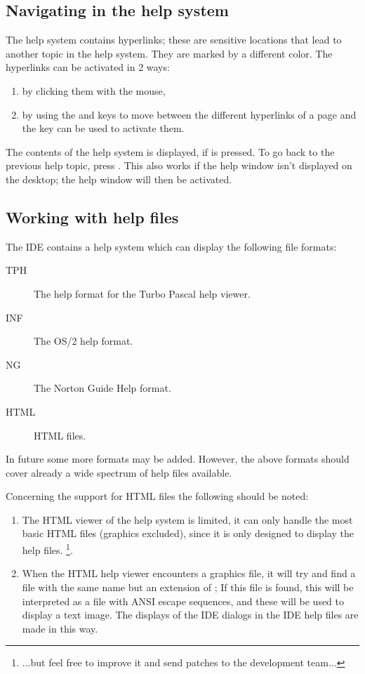 \subsection{Navigating in the help system}
The help system contains hyperlinks; these are sensitive locations that
lead to another topic in the help system. They are marked by a different
color. The hyperlinks can be activated in 2 ways:
\begin{enumerate}
\item by clicking them with the mouse,
\item by using the  and  keys to move between 
the different hyperlinks of a page and the  key can be used 
to activate them.
\end{enumerate}

The contents of the help system is displayed, if  is
pressed. To go back to the previous help topic, press . 
This also works if the help window isn't displayed on the desktop; the help
window will then be activated.

%
%
\subsection{Working with help files}
The IDE contains a help system which can display the following file formats:
\begin{description}
\item[TPH] The help format for the Turbo Pascal help viewer.
\item[INF] The OS/2 help format.
\item[NG] The Norton Guide Help format.
\item[HTML] HTML files. 
\end{description}
In future some more formats may be added. However, the above formats should 
cover already a wide spectrum of help files available.

\begin{remark}
Concerning the support for HTML files the following should be noted:
\begin{enumerate}
\item
The HTML viewer of the  help system is limited, it can only handle the 
most basic HTML files (graphics excluded), since it is only designed 
to display the \fpc help files. \footnote{...but feel free to improve it and send patches to the 
\fpc development team...}.
\item
When the HTML help viewer encounters a graphics file, it will try and find a
file with the same name but an extension of ; If this file is
found, this will be interpreted as a file with ANSI escape sequences, and 
these will be used to display a text image. The displays of the IDE dialogs
in the IDE help files are made in this way.
\end{enumerate}
\end{remark}

